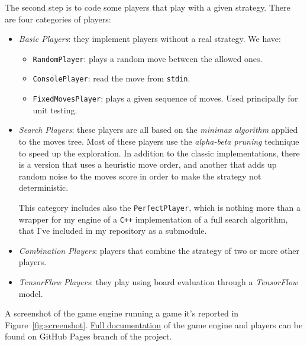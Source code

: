 \documentclass{article}
\newcommand{\ipy}[1]{\texttt{#1}}
\begin{document}
  The second step is to code some players that play with a given strategy. There are four categories of players:
  \begin{itemize}
    \item \emph{Basic Players}: they implement players without a real strategy. We have:
      \begin{itemize}
        \item \ipy{RandomPlayer}: plays a random move between the allowed ones.
        \item \ipy{ConsolePlayer}: read the move from \texttt{stdin}.
        \item \ipy{FixedMovesPlayer}: plays a given sequence of moves. Used principally for unit testing.
      \end{itemize}
    \item \emph{Search Players}: these players are all based on the \emph{minimax algorithm} applied to the moves tree.
      Most of these players use the \emph{alpha-beta pruning} technique to speed up the exploration. In addition to the classic implementations, there is a version that uses a heuristic  move order, and another that adds up random noise to the moves score in order to make the strategy not deterministic.
      
      This category includes also the \ipy{PerfectPlayer}, which is nothing more than a wrapper for my engine of a \texttt{C++} implementation of a full search algorithm\cite{perfectsolvertutotial, perfectsolverimplementation}, that I've included in my repository as a submodule. 
    \item \emph{Combination Players}: players that combine the strategy of two or more other players.
    \item \emph{TensorFlow Players}: they play using board evaluation through a \textit{TensorFlow} model.
  \end{itemize}
  
  A screenshot of the game engine running a game it's reported in Figure~\ref{fig:screenshot}.
  \href{https://arn4.github.io/connect4/doc/}{Full documentation} of the game engine and players can be found on GitHub Pages branch of the project.
  
\end{document}
